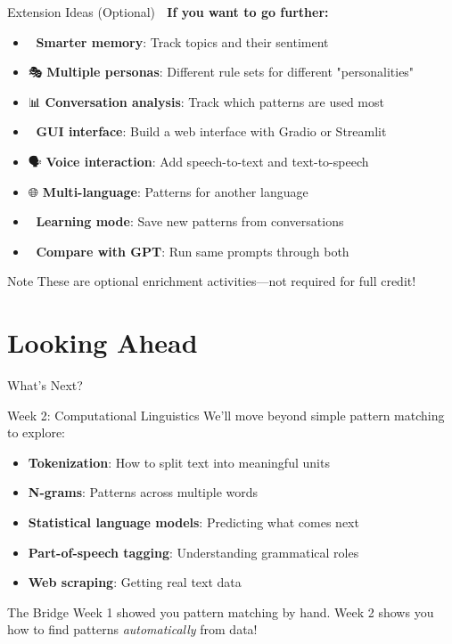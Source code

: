 \documentclass[aspectratio=169]{beamer}
\begin{document}
\begin{frame}[shrink=10]{Extension Ideas (Optional) 🌟}
\textbf{If you want to go further:}

\begin{itemize}\setlength{\itemsep}{0pt}
    \item 🧠 \textbf{Smarter memory}: Track topics and their sentiment
    \item 🎭 \textbf{Multiple personas}: Different rule sets for different "personalities"
    \item 📊 \textbf{Conversation analysis}: Track which patterns are used most
    \item 🎨 \textbf{GUI interface}: Build a web interface with Gradio or Streamlit
    \item 🗣️ \textbf{Voice interaction}: Add speech-to-text and text-to-speech
    \item 🌐 \textbf{Multi-language}: Patterns for another language
    \item 📝 \textbf{Learning mode}: Save new patterns from conversations
    \item 🤖 \textbf{Compare with GPT}: Run same prompts through both
\end{itemize}

\vspace{0.3cm}

\begin{alertblock}{Note}
These are optional enrichment activities—not required for full credit!
\end{alertblock}
\end{frame}

\section{Looking Ahead}

\begin{frame}{What's Next? 🔮}
\small
\begin{block}{Week 2: Computational Linguistics}
We'll move beyond simple pattern matching to explore:
\begin{itemize}\setlength{\itemsep}{0pt}
    \item \textbf{Tokenization}: How to split text into meaningful units
    \item \textbf{N-grams}: Patterns across multiple words
    \item \textbf{Statistical language models}: Predicting what comes next
    \item \textbf{Part-of-speech tagging}: Understanding grammatical roles
    \item \textbf{Web scraping}: Getting real text data
\end{itemize}
\end{block}

\vspace{0.3cm}

\begin{alertblock}{The Bridge}
Week 1 showed you pattern matching by hand. Week 2 shows you how to find patterns \textit{automatically} from data!
\end{alertblock}
\end{frame}
\end{document}
